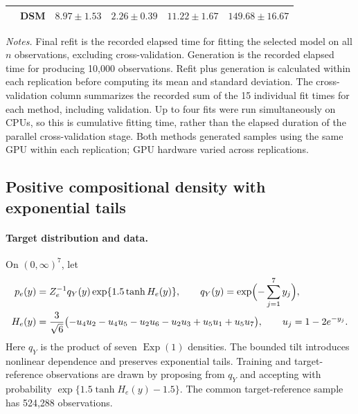 \begin{table}[htbp]
\begin{tabular}{rlcccc}
 & DSM & $8.97 \pm 1.53$ & $2.26 \pm 0.39$ & $11.22 \pm 1.67$ & $149.68 \pm 16.67$ \\
\bottomrule
\end{tabular}
\par\smallskip
\begin{minipage}{\textwidth}
\footnotesize
\textit{Notes.} Final refit is the recorded elapsed time for fitting the selected model on all $n$ observations, excluding cross-validation. Generation is the recorded elapsed time for producing 10,000 observations. Refit plus generation is calculated within each replication before computing its mean and standard deviation. The cross-validation column summarizes the recorded sum of the 15 individual fit times for each method, including validation. Up to four fits were run simultaneously on CPUs, so this is cumulative fitting time, rather than the elapsed duration of the parallel cross-validation stage. Both methods generated samples using the same GPU within each replication; GPU hardware varied across replications.
\end{minipage}
\end{table}

\subsection{Positive compositional density with exponential tails}
\label{sec:supp_exponential_composition}

\paragraph{Target distribution and data.}
On $(0,\infty)^7$, let
\begin{align}
 p_e(y)&=Z_e^{-1}q_Y(y)\exp\{1.5\tanh H_e(y)\},\qquad
 q_Y(y)=\exp\Bigl(-\sum_{j=1}^7 y_j\Bigr),
 \label{eq:supp_exponential_density}\\
 H_e(y)&=\frac{3}{\sqrt 6}
  \bigl(-u_4u_2-u_4u_5-u_2u_6-u_2u_3+u_5u_1+u_5u_7\bigr),
 \qquad u_j=1-2e^{-y_j}.\nonumber
\end{align}
Here $q_Y$ is the product of seven $\operatorname{Exp}(1)$ densities. The
bounded tilt introduces nonlinear dependence and preserves exponential
tails. Training and target-reference observations are drawn by proposing
from $q_Y$ and accepting with probability
$\exp\{1.5\tanh H_e(y)-1.5\}$. The common target-reference sample has
524,288 observations.

